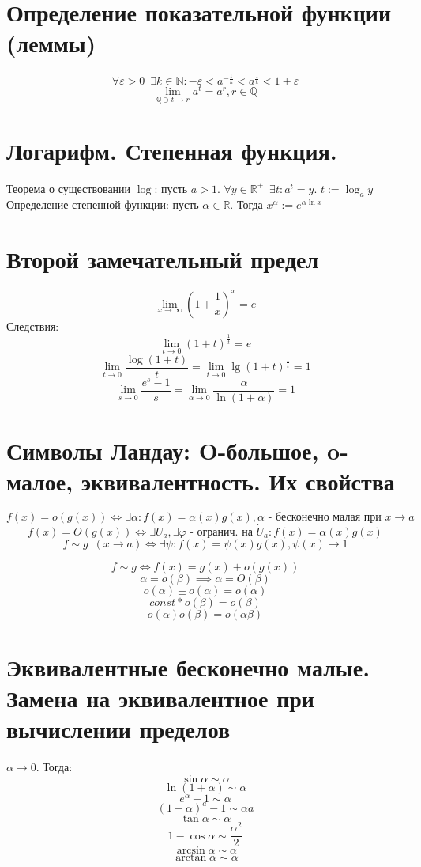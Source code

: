 \documentclass[11pt, a4paper]{article}
\def\R{\mathbb{R}}
\def\Q{\mathbb{Q}}
\def\N{\mathbb{N}}
\def\sp{\, \, \,}
\begin{document}
    \section{Определение показательной функции (леммы)}
    $$\forall \varepsilon > 0 \sp \exists k \in \N : -\varepsilon < a^{-\frac{1}{k}} < a^{\frac{1}{k}} < 1 + \varepsilon$$
    $$\lim_{\Q \ni t \to r} a^t = a^r , r \in \Q$$

    \section{Логарифм. Степенная функция.}
    Теорема о существовании $\log$: пусть $a > 1$. $\forall y \in \R^+ \sp \exists t: a^t = y$. $t := \log_a y$\\
    Определение степенной функции: пусть $\alpha \in \R$. Тогда $x^{\alpha} := e^{\alpha \ln x}$

    \section{Второй замечательный предел}
    $$\lim_{x \to \infty} \left(1 + \frac{1}{x}\right)^x = e$$
    Следствия:
    $$\lim_{t \to 0} (1+t)^{\frac{1}{t}} = e$$
    $$\lim_{t \to 0} \frac{\log (1+t)}{t} = \lim_{t \to 0} \lg (1+t)^{\frac{1}{t}} = 1$$
    $$\lim_{s \to 0} \frac{e^s - 1}{s} = \lim_{\alpha \to 0} \frac{\alpha}{\ln (1 + \alpha)} = 1$$

    \section{Символы Ландау: O-большое, o-малое, эквивалентность. Их свойства}
    $$f(x) = o(g(x)) \iff \exists \alpha : f(x) = \alpha (x) g(x), \alpha \text{ - бесконечно малая при } x \to a$$
    $$f(x) = O(g(x)) \iff \exists U_a, \exists \varphi \text{ - огранич. на } \dot{U}_a : f(x) = \alpha (x) g(x)$$
    $$f \sim g \sp (x \to a) \iff \exists \psi : f(x) = \psi (x) g(x), \psi (x) \to 1$$

    $$f \sim g \iff f(x) = g(x) + o(g(x))$$
    $$\alpha = o(\beta) \implies \alpha = O(\beta)$$
    $$o(\alpha) \pm o(\alpha) = o(\alpha)$$
    $$const * o(\beta) = o(\beta)$$
    $$o(\alpha)o(\beta) = o(\alpha \beta)$$
    

    \section{Эквивалентные бесконечно малые. Замена на эквивалентное при вычислении пределов}
    $\alpha \to 0$. Тогда:
    $$\sin \alpha \sim \alpha$$
    $$\ln (1 + \alpha) \sim \alpha$$
    $$e^{\alpha} - 1 \sim \alpha$$
    $$(1 + \alpha)^a - 1 \sim \alpha a$$
    $$\tan \alpha \sim \alpha$$
    $$1 - \cos \alpha \sim \frac{\alpha ^2}{2}$$
    $$\arcsin \alpha \sim \alpha$$
    $$\arctan \alpha \sim \alpha$$
\end{document}
